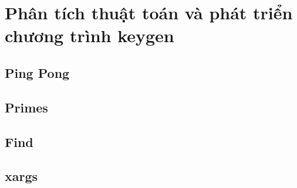 \section{Phân tích thuật toán và phát triển chương trình keygen}

\subsection{Ping Pong}

\newpage

\subsection{Primes}

\newpage

\subsection{Find}

\newpage

\subsection{xargs}

\newpage